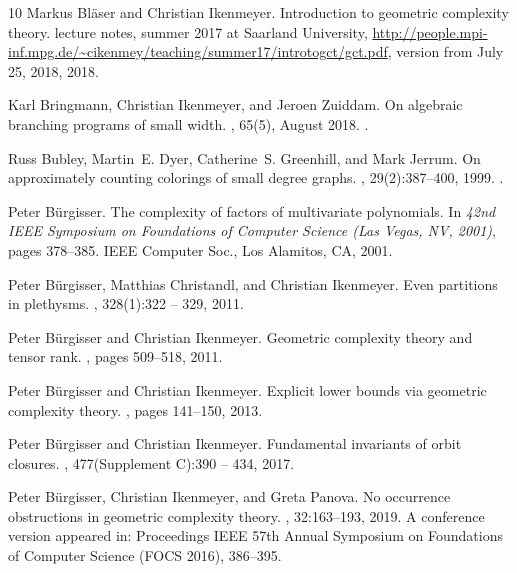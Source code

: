 \documentclass[10pt,a4paper]{article}
\numberwithin{equation}{section}
\theoremstyle{definition}
\begin{document}
\begin{thebibliography}{10}
Markus Bl{\"a}ser and Christian Ikenmeyer.
\newblock Introduction to geometric complexity theory.
\newblock lecture notes, summer 2017 at Saarland University,
  \url{http://people.mpi-inf.mpg.de/~cikenmey/teaching/summer17/introtogct/gct.pdf},
  version from July 25, 2018, 2018.

Karl Bringmann, Christian Ikenmeyer, and Jeroen Zuiddam.
\newblock On algebraic branching programs of small width.
, 65(5), August 2018.
\newblock \href {https://doi.org/10.1145/3209663} {}.

Russ Bubley, Martin~E. Dyer, Catherine~S. Greenhill, and Mark Jerrum.
\newblock On approximately counting colorings of small degree graphs.
, 29(2):387--400, 1999.
\newblock \href {https://doi.org/10.1137/S0097539798338175}
  {}.

Peter B{\"u}rgisser.
\newblock The complexity of factors of multivariate polynomials.
\newblock In {\em 42nd {IEEE} {S}ymposium on {F}oundations of {C}omputer
  {S}cience ({L}as {V}egas, {NV}, 2001)}, pages 378--385. IEEE Computer Soc.,
  Los Alamitos, CA, 2001.

Peter B\"urgisser, Matthias Christandl, and Christian Ikenmeyer.
\newblock Even partitions in plethysms.
, 328(1):322 -- 329, 2011.

Peter B{\"u}rgisser and Christian Ikenmeyer.
\newblock Geometric complexity theory and tensor rank.
, pages 509--518, 2011.

Peter B{\"u}rgisser and Christian Ikenmeyer.
\newblock Explicit lower bounds via geometric complexity theory.
, pages 141--150, 2013.

Peter B{\"u}rgisser and Christian Ikenmeyer.
\newblock Fundamental invariants of orbit closures.
, 477(Supplement C):390 -- 434, 2017.

Peter B{\"u}rgisser, Christian Ikenmeyer, and Greta Panova.
\newblock No occurrence obstructions in geometric complexity theory.
, 32:163--193,
  2019.
\newblock A conference version appeared in: Proceedings IEEE 57th Annual
  Symposium on Foundations of Computer Science (FOCS 2016), 386--395.


\end{thebibliography}
\end{document}
